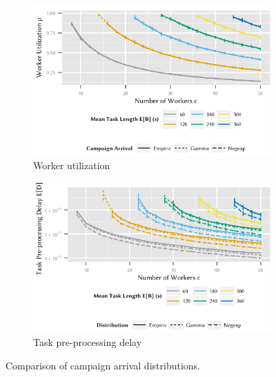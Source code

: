 \begin{figure}
	\centering
	\begin{subfigure}{\columnwidth}
		\includegraphics{cloud/crowdsourcing/measurements/figures/distribution_utilization}
		\caption{Worker utilization}
		\label{fig:cloud:crowdsourcing:measurements:comparison:distribution:utilization}
	\end{subfigure}

	\begin{subfigure}{\columnwidth}
		\includegraphics{cloud/crowdsourcing/measurements/figures/distribution_task_delay}
		\caption{Task pre-processing delay}
		\label{fig:cloud:crowdsourcing:measurements:comparison:distribution:task_delay}
	\end{subfigure}
	\caption{Comparison of campaign arrival distributions.}
	\label{fig:cloud:crowdsourcing:measurements:comparison:distribution}
\end{figure}

